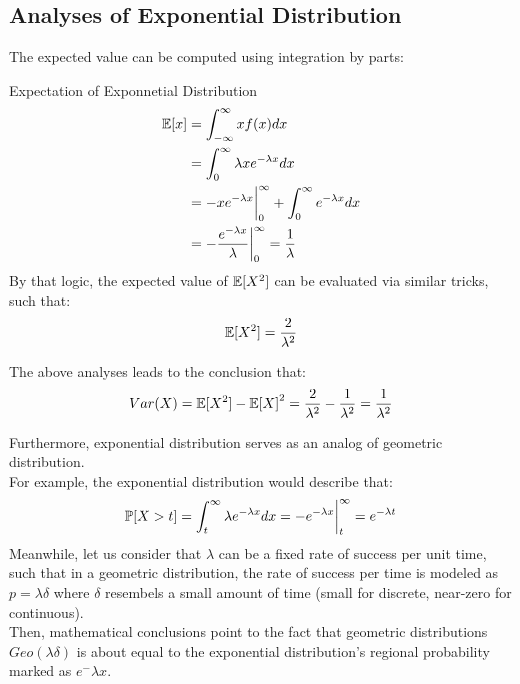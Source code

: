 \subsection{Analyses of Exponential Distribution}
The expected value can be computed using integration by parts:
\begin{ln-define}{Expectation of Exponnetial Distribution}{}
    \begin{align*}
        \E[x] &= \int_{-\infty}^{\infty} x f(x) dx \\
        &= \int_0^{\infty} \lambda x e^{-\lambda x} dx \\
        &= -x e^{-\lambda x} {\bigg|}_0^{\infty} + \int_0^{\infty} e^{-\lambda x} dx \\
        &= -\frac{e^{-\lambda x}}{\lambda} {\bigg|}_0^{\infty} = \frac{1}{\lambda}
    \end{align*}
    By that logic, the expected value of $\E[X^2]$ can be evaluated via similar tricks, such that:
    \[\E[X^2] = \frac{2}{\lambda^2}\]
\end{ln-define}
The above analyses leads to the conclusion that:
\[Var(X) = \E[X^2] - {\E[X]}^2 = \frac{2}{\lambda^2} - \frac{1}{\lambda^2} = \frac{1}{\lambda^2}\]

Furthermore, exponential distribution serves as an analog of geometric distribution. \\
For example, the exponential distribution would describe that:
\[
    \P[X > t] = \int_t^{\infty} \lambda e^{-\lambda x} dx = -e^{-\lambda x} {\bigg|}_t^{\infty} = e^{-\lambda t}
\]
Meanwhile, let us consider that $\lambda$ can be a fixed rate of success per unit time, such that in a geometric distribution, the rate of success per time is modeled as $p = \lambda \delta$ where $\delta$ resembels a small amount of time (small for discrete, near-zero for continuous). \\
Then, mathematical conclusions point to the fact that geometric distributions $Geo(\lambda \delta)$ is about equal to the exponential distribution's regional probability marked as $e^-{\lambda x}$.

